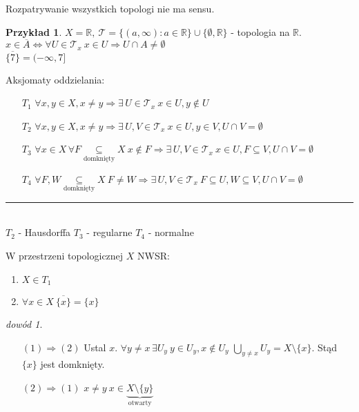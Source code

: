\documentclass[twoside,10pt]{article}
\theoremstyle{definition}
\theoremstyle{definition}
\theoremstyle{definition}
\theoremstyle{definition}
\theoremstyle{remark}
\newtheorem*{dd}{dowód}
\theoremstyle{definition}
\theoremstyle{definition}
\theoremstyle{definition}
\theoremstyle{definition}
\newtheorem*{prz}{Przykład}
\theoremstyle{definition}
\theoremstyle{definition}
\begin{document}
\vspace{1cm}
Rozpatrywanie wszystkich topologi nie ma sensu.
\begin{prz} 
    $X = \mathbb R, \ \mathcal T = \{ (a,\infty): a \in \mathbb R \} \cup \{\emptyset,\mathbb R\}$ - topologia na $\mathbb R$. \\ 
    $x \in \overline A \Leftrightarrow \forall U \in \mathcal T_x \ x \in U \Rightarrow U \cap A \neq \emptyset$ \\ 
    $\overline{\{7\}} = (-\infty,7]$
\end{prz}
\begin{df} Aksjomaty oddzielania: 
    \begin{itemize} 
        \item[$T_1$] $\forall x,y \in X, x \neq y \Rightarrow \exists \, U \in \mathcal T_x \ x \in U, y \notin U$
        \item[$T_2$] $\forall x,y \in X, x \neq y \Rightarrow \exists \, U,V \in \mathcal T_x 
            \ x \in U, y \in V, U \cap V = \emptyset$
        \item[$T_3$] $\forall x \in X \, \forall F \underset{\text{domknięty}}{\subseteq} X \ x \notin F 
            \Rightarrow \exists \, U, V \in \mathcal T_x \ x \in U, F \subseteq V, U \cap V = \emptyset$
        \item[$T_4$] $\forall F, W \underset{\text{domknięty}}{\subseteq} X \ F \neq W \Rightarrow 
            \exists \, U, V \in \mathcal T_x \ F \subseteq U, W \subseteq V, U \cap V = \emptyset$
    \end{itemize} 
    \noindent \rule{2cm}{0.4pt} \\ 
    \footnotesize{$T_2$ - Hausdorffa
    $T_3$ - regularne 
    $T_4$ - normalne}
    
\end{df} 
\begin{lem} 
    W przestrzeni topologicznej $X$ NWSR: 
    \begin{enumerate}[(1)] 
        \item $X \in T_1$
        \item $\forall x \in X \ \overline{\{x\}} = \{x\}$
    \end{enumerate} 
    \begin{dd} \hfill 
        \begin{itemize} 
            \item[$(1) \Rightarrow (2)$] Ustal $x$. $\forall y \neq x \, \exists U_y \ y \in U_y, x \notin U_y$
                $\bigcup\limits_{y \neq x} U_y = X \setminus \{x\}$. Stąd $\{x\}$ jest domknięty.
            \item[$(2) \Rightarrow (1)$] $x \neq y \ x \in  \underbrace{X \setminus \{y\}}_{\text{otwarty}}$
        \end{itemize} 
    \end{dd}
\end{lem} 
\end{document}
